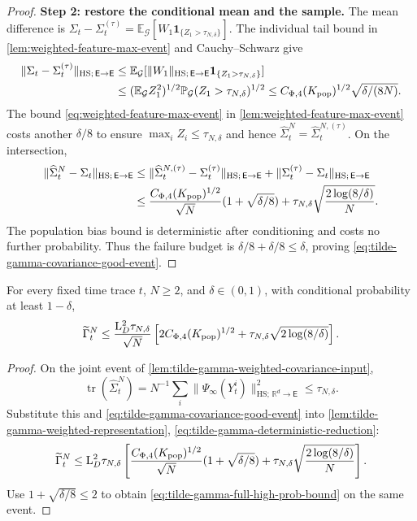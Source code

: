 \begin{proof}
\par\noindent\textbf{Step 2: restore the conditional mean and the sample.}
The mean difference is
$\Sigma_t-\Sigma_t^{(\tau)}=\mathbb E_{\mathcal G}[W_1\mathbf1_{\{Z_1>\tau_{N,\delta}\}}]$.
The individual tail bound in \cref{lem:weighted-feature-max-event}
and Cauchy--Schwarz give
\[
\begin{aligned}
 \|\Sigma_t-\Sigma_t^{(\tau)}\|_{\mathrm{HS};\,\mathsf E\to\mathsf E}
 &\le\mathbb E_{\mathcal G}
       [\|W_1\|_{\mathrm{HS};\,\mathsf E\to\mathsf E}\mathbf1_{\{Z_1>\tau_{N,\delta}\}}]\\
 &\le(\mathbb E_{\mathcal G}Z_1^2)^{1/2}
       \mathbb P_{\mathcal G}(Z_1>\tau_{N,\delta})^{1/2}
 \le C_{\Phi,4}(K_{\rm pop})^{1/2}\sqrt{\delta/(8N)}.
\end{aligned}
\]
The bound \eqref{eq:weighted-feature-max-event} in
\cref{lem:weighted-feature-max-event} costs another $\delta/8$ to ensure
$\max_iZ_i\le\tau_{N,\delta}$ and hence
$\widehat\Sigma_t^N=\widehat\Sigma_t^{N,(\tau)}$. On the intersection,
\[
\begin{aligned}
 \|\widehat\Sigma_t^N-\Sigma_t\|_{\mathrm{HS};\,\mathsf E\to\mathsf E}
 &\le\|\widehat\Sigma_t^{N,(\tau)}-\Sigma_t^{(\tau)}\|_{\mathrm{HS};\,\mathsf E\to\mathsf E}
          +\|\Sigma_t^{(\tau)}-\Sigma_t\|_{\mathrm{HS};\,\mathsf E\to\mathsf E}\\
 &\le\frac{C_{\Phi,4}(K_{\rm pop})^{1/2}}{\sqrt N}(1+\sqrt{\delta/8})
       +\tau_{N,\delta}\sqrt{\frac{2\log(8/\delta)}N}.
\end{aligned}
\]
The population bias bound is deterministic after conditioning and costs
no further probability. Thus the failure budget is
$\delta/8+\delta/8\le\delta$, proving
\eqref{eq:tilde-gamma-covariance-good-event}.
\end{proof}

\begin{corollary}
\label{cor:tilde-gamma-full-weighted-bound}
For every fixed time trace $t$, $N\ge2$, and $\delta\in(0,1)$, with
conditional probability at least $1-\delta$,
\begin{equation}
\label{eq:tilde-gamma-full-high-prob-bound}
 \widetilde\Gamma_t^N
 \le\frac{\mathrm L_D^2\tau_{N,\delta}}{\sqrt N}
       \left[2C_{\Phi,4}(K_{\rm pop})^{1/2}
                 +\tau_{N,\delta}\sqrt{2\log(8/\delta)}\right].
\end{equation}
\end{corollary}
\begin{proof}
On the joint event of \cref{lem:tilde-gamma-weighted-covariance-input},
\[
 \operatorname{tr}(\widehat\Sigma_t^N)
 =N^{-1}\sum_i\|\Psi_\infty(Y_t^i)\|_{\mathrm{HS};\,\mathbb R^d\to\mathsf E}^2\le\tau_{N,\delta}.
\]
Substitute this and \eqref{eq:tilde-gamma-covariance-good-event} into
\cref{lem:tilde-gamma-weighted-representation},
\eqref{eq:tilde-gamma-deterministic-reduction}:
\[
 \widetilde\Gamma_t^N\le\mathrm L_D^2\tau_{N,\delta}
 \left[\frac{C_{\Phi,4}(K_{\rm pop})^{1/2}}{\sqrt N}(1+\sqrt{\delta/8})
       +\tau_{N,\delta}\sqrt{\frac{2\log(8/\delta)}N}\right].
\]
Use $1+\sqrt{\delta/8}\le2$ to obtain
\eqref{eq:tilde-gamma-full-high-prob-bound} on the same event.
\end{proof}

